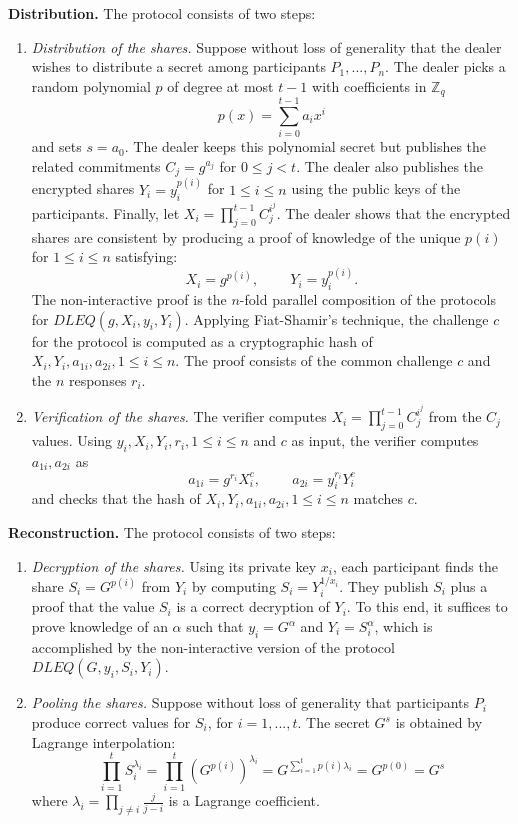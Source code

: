\documentclass[letterpaper,twocolumn,10pt]{article}
\theoremstyle{definition}
\theoremstyle{remark}
\begin{document}
\textbf{Distribution.} The protocol consists of two steps:
\begin{enumerate}
\item \textit{Distribution of the shares.} Suppose without loss of generality that the dealer wishes to distribute a secret among participants $P_1, ..., P_n$. The dealer picks a random polynomial $p$ of degree at most $t - 1$ with coefficients in $\mathbb{Z}_q$
$$p(x) = \sum_{i = 0}^{t - 1} a_i x^i$$
and sets $s = a_0$. The dealer keeps this polynomial secret but publishes the related commitments $C_j = g^{a_j}$ for $0 \leq j < t$. The dealer also publishes the encrypted shares $Y_i = y_i^{p(i)}$ for $1 \leq i \leq n$ using the public keys of the participants. Finally, let $X_i = \prod_{j = 0}^{t - 1} C_j^{i^j}$. The dealer shows that the encrypted shares are consistent by producing a proof of knowledge of the unique $p(i)$ for $1 \leq i \leq n$ satisfying:
$$X_i = g^{p(i)}, \phantom{ABC} Y_i = y_i^{p(i)}.$$
The non-interactive proof is the $n$-fold parallel composition of the protocols for $DLEQ(g, X_i, y_i, Y_i)$. Applying Fiat-Shamir's technique, the challenge $c$ for the protocol is computed as a cryptographic hash of $X_i, Y_i, a_{1i}, a_{2i}, 1 \leq i \leq n$. The proof consists of the common challenge $c$ and the $n$ responses $r_i$.
\item \textit{Verification of the shares.} The verifier computes $X_i = \prod_{j = 0}^{t - 1} C_j^{i^j}$ from the $C_j$ values. Using $y_i, X_i, Y_i, r_i, 1 \leq i \leq n$ and $c$ as input, the verifier computes $a_{1i}, a_{2i}$ as
$$a_{1i} = g^{r_i} X_i^{c}, \phantom{ABC} a_{2i} = y_i^{r_i} Y_i^{c}$$
and checks that the hash of $X_i, Y_i, a_{1i}, a_{2i}, 1 \leq i \leq n$ matches $c$.
\end{enumerate}

\textbf{Reconstruction.} The protocol consists of two steps:
\begin{enumerate}
\item \textit{Decryption of the shares.} Using its private key $x_i$, each participant finds the share $S_i = G^{p(i)}$ from $Y_i$ by computing $S_i = Y_i^{1 / x_i}$. They publish $S_i$ plus a proof that the value $S_i$ is a correct decryption of $Y_i$. To this end, it suffices to prove knowledge of an $\alpha$ such that $y_i = G^\alpha$ and $Y_i = S_i^\alpha$, which is accomplished by the non-interactive version of the protocol $DLEQ(G, y_i, S_i, Y_i)$.
\item \textit{Pooling the shares.} Suppose without loss of generality that participants $P_i$ produce correct values for $S_i$, for $i = 1, ..., t$. The secret $G^s$ is obtained by Lagrange interpolation:
$$\prod_{i = 1}^{t} S_i^{\lambda_i} = \prod_{i = 1}^{t} \left(G^{p(i)}\right)^{\lambda_i} = G^{\sum_{i = 1}^{t} p(i) \lambda_i} = G^{p(0)} = G^s$$
where $\lambda_i = \prod_{j \neq i} \frac{j}{j - i}$ is a Lagrange coefficient.
\end{enumerate}
\end{document}
